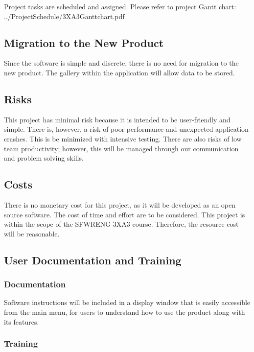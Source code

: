 \documentclass[12pt, titlepage]{article}
\begin{document}
Project tasks are scheduled and assigned. Please refer to project Gantt chart: ../ProjectSchedule/3XA3Ganttchart.pdf

\subsection{Migration to the New Product}

Since the software is simple and discrete, there is no need for migration to the new product. The gallery within the application will allow data to be stored.

\subsection{Risks}

This project has minimal risk because it is intended to be user-friendly and simple. There is, however, a risk of poor performance and unexpected application crashes. This is be minimized with intensive testing. There are also risks of low team productivity; however, this will be managed through our communication and problem solving skills.

\subsection{Costs}

There is no monetary cost for this project, as it will be developed as an open source software. The cost of time and effort are to be considered. This project is within the scope of the SFWRENG 3XA3 course. Therefore, the resource cost will be reasonable.

\subsection{User Documentation and Training}

\subsubsection{Documentation}

Software instructions will be included in a display window that is easily accessible from the main menu, for users to understand how to use the product along with its features.

\subsubsection{Training}
\end{document}
